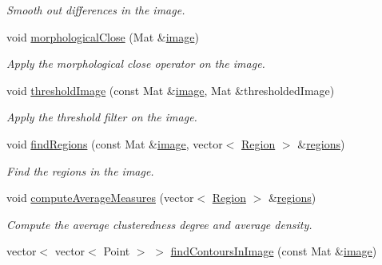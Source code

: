 \begin{DoxyCompactItemize}
\begin{DoxyCompactList}\small\item\em Smooth out differences in the image. \end{DoxyCompactList}\item 
void \hyperlink{classmultiscale_1_1analysis_1_1RegionDetector_adcb8ab3ced63de9168734f0b24072705}{morphological\-Close} (Mat \&\hyperlink{classmultiscale_1_1analysis_1_1Detector_a523830a6cfe409694ce8327c3c736fbd}{image})
\begin{DoxyCompactList}\small\item\em Apply the morphological close operator on the image. \end{DoxyCompactList}\item 
void \hyperlink{classmultiscale_1_1analysis_1_1RegionDetector_a614cd80fac5d3df2a25c401bb221149c}{threshold\-Image} (const Mat \&\hyperlink{classmultiscale_1_1analysis_1_1Detector_a523830a6cfe409694ce8327c3c736fbd}{image}, Mat \&thresholded\-Image)
\begin{DoxyCompactList}\small\item\em Apply the threshold filter on the image. \end{DoxyCompactList}\item 
void \hyperlink{classmultiscale_1_1analysis_1_1RegionDetector_a886ec5ee1cd2fd816c1cfd4e2ea6778e}{find\-Regions} (const Mat \&\hyperlink{classmultiscale_1_1analysis_1_1Detector_a523830a6cfe409694ce8327c3c736fbd}{image}, vector$<$ \hyperlink{classmultiscale_1_1analysis_1_1Region}{Region} $>$ \&\hyperlink{classmultiscale_1_1analysis_1_1RegionDetector_aa6517ceb3a58295448d32e6e41499893}{regions})
\begin{DoxyCompactList}\small\item\em Find the regions in the image. \end{DoxyCompactList}\item 
void \hyperlink{classmultiscale_1_1analysis_1_1RegionDetector_aee096ec729a12b62fd0c61f74601aad1}{compute\-Average\-Measures} (vector$<$ \hyperlink{classmultiscale_1_1analysis_1_1Region}{Region} $>$ \&\hyperlink{classmultiscale_1_1analysis_1_1RegionDetector_aa6517ceb3a58295448d32e6e41499893}{regions})
\begin{DoxyCompactList}\small\item\em Compute the average clusteredness degree and average density. \end{DoxyCompactList}\item 
vector$<$ vector$<$ Point $>$ $>$ \hyperlink{classmultiscale_1_1analysis_1_1RegionDetector_a19918b5cd0ec310ad6149c7345870b3f}{find\-Contours\-In\-Image} (const Mat \&\hyperlink{classmultiscale_1_1analysis_1_1Detector_a523830a6cfe409694ce8327c3c736fbd}{image})

\end{DoxyCompactItemize}
